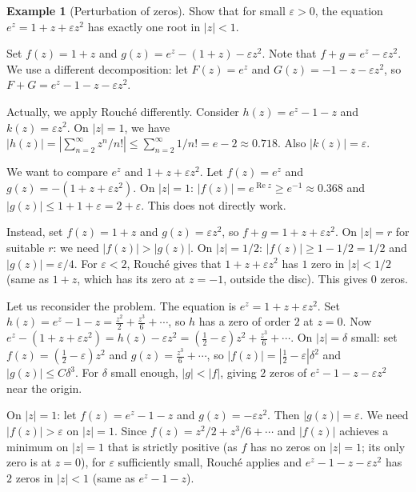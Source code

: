 \documentclass[12pt,a4paper,openany]{book}
\theoremstyle{definition}
\newtheorem{example}[definition]{Example}
\theoremstyle{plain}
\theoremstyle{remark}
\DeclareMathOperator{\re}{Re}
\newcommand{\abs}[1]{\left|#1\right|}
\begin{document}
\begin{example}[Perturbation of zeros]\label{ex:rouche-perturbation}
Show that for small $\varepsilon > 0$, the equation $e^z = 1 + z + \varepsilon z^2$
has exactly one root in $\abs{z} < 1$.

Set $f(z) = 1 + z$ and $g(z) = e^z - (1 + z) - \varepsilon z^2$. Note that
$f + g = e^z - \varepsilon z^2$. We use a different decomposition: let
$F(z) = e^z$ and $G(z) = -1 - z - \varepsilon z^2$, so $F + G = e^z - 1 - z - \varepsilon z^2$.

Actually, we apply Rouch\'{e} differently. Consider $h(z) = e^z - 1 - z$ and
$k(z) = \varepsilon z^2$. On $\abs{z} = 1$, we have
$\abs{h(z)} = \abs{\sum_{n=2}^{\infty} z^n/n!} \leq \sum_{n=2}^{\infty} 1/n! = e - 2 \approx 0.718$.
Also $\abs{k(z)} = \varepsilon$.

We want to compare $e^z$ and $1 + z + \varepsilon z^2$. Let $f(z) = e^z$
and $g(z) = -(1+z+\varepsilon z^2)$. On $\abs{z}=1$: $\abs{f(z)} = e^{\re z} \geq e^{-1} \approx 0.368$
and $\abs{g(z)} \leq 1 + 1 + \varepsilon = 2 + \varepsilon$. This does not directly work.

Instead, set $f(z) = 1 + z$ and $g(z) = \varepsilon z^2$, so $f + g = 1 + z + \varepsilon z^2$.
On $\abs{z} = r$ for suitable $r$: we need $\abs{f(z)} > \abs{g(z)}$.
On $\abs{z} = 1/2$: $\abs{f(z)} \geq 1 - 1/2 = 1/2$ and $\abs{g(z)} = \varepsilon/4$.
For $\varepsilon < 2$, Rouch\'{e} gives that $1 + z + \varepsilon z^2$ has
$1$ zero in $\abs{z} < 1/2$ (same as $1 + z$, which has its zero at $z = -1$,
outside the disc). This gives $0$ zeros.

Let us reconsider the problem. The equation is $e^z = 1 + z + \varepsilon z^2$.
Set $h(z) = e^z - 1 - z = \frac{z^2}{2} + \frac{z^3}{6} + \cdots$, so
$h$ has a zero of order $2$ at $z=0$. Now $e^z - (1+z+\varepsilon z^2) = h(z) - \varepsilon z^2
= (\frac{1}{2}-\varepsilon)z^2 + \frac{z^3}{6}+\cdots$. On $\abs{z}=\delta$ small:
set $f(z) = (\frac{1}{2}-\varepsilon)z^2$ and $g(z) = \frac{z^3}{6}+\cdots$, so
$\abs{f(z)} = \abs{\frac{1}{2}-\varepsilon}\delta^2$ and $\abs{g(z)} \leq C\delta^3$.
For $\delta$ small enough, $\abs{g} < \abs{f}$, giving $2$ zeros of $e^z - 1 - z - \varepsilon z^2$ near the origin.

On $\abs{z} = 1$: let $f(z) = e^z - 1 - z$ and $g(z) = -\varepsilon z^2$.
Then $\abs{g(z)} = \varepsilon$. We need $\abs{f(z)} > \varepsilon$ on $\abs{z}=1$.
Since $f(z) = z^2/2 + z^3/6 + \cdots$ and $\abs{f(z)}$ achieves a minimum on
$\abs{z}=1$ that is strictly positive (as $f$ has no zeros on $\abs{z}=1$;
its only zero is at $z=0$), for $\varepsilon$ sufficiently small, Rouch\'{e}
applies and $e^z - 1 - z - \varepsilon z^2$ has $2$ zeros in $\abs{z}<1$
(same as $e^z - 1 - z$).


\end{example}
\end{document}
